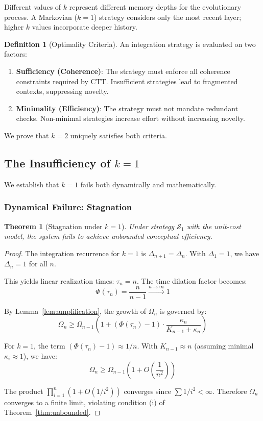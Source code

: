 \documentclass[11pt]{article}
\theoremstyle{definition}
\newtheorem{definition}{Definition}
\theoremstyle{plain}
\newtheorem{theorem}{Theorem}
\theoremstyle{remark}
\begin{document}
Different values of $k$ represent different memory depths for the evolutionary process. A Markovian ($k=1$) strategy considers only the most recent layer; higher $k$ values incorporate deeper history.

\begin{definition}[Optimality Criteria]
An integration strategy is evaluated on two factors:
\begin{enumerate}
\item \textbf{Sufficiency (Coherence)}: The strategy must enforce all coherence constraints required by CTT. Insufficient strategies lead to fragmented contexts, suppressing novelty.
\item \textbf{Minimality (Efficiency)}: The strategy must not mandate redundant checks. Non-minimal strategies increase effort without increasing novelty.
\end{enumerate}
\end{definition}

We prove that $k=2$ uniquely satisfies both criteria.

\subsection{The Insufficiency of $k=1$}

We establish that $k=1$ fails both dynamically and mathematically.

\subsubsection{Dynamical Failure: Stagnation}

\begin{theorem}[Stagnation under $k=1$]\label{thm:k1-stagnation}
Under strategy $\mathcal{S}_1$ with the unit-cost model, the system fails to achieve unbounded conceptual efficiency.
\end{theorem}

\begin{proof}
The integration recurrence for $k=1$ is $\Delta_{n+1} = \Delta_n$. With $\Delta_1 = 1$, we have $\Delta_n = 1$ for all $n$.

This yields linear realization times: $\tau_n = n$. The time dilation factor becomes:
\[
\Phi(\tau_n) = \frac{n}{n-1} \xrightarrow{n\to\infty} 1
\]

By Lemma~\ref{lem:amplification}, the growth of $\Omega_n$ is governed by:
\[
\Omega_n \geq \Omega_{n-1}\left(1 + (\Phi(\tau_n) - 1) \cdot \frac{\kappa_n}{K_{n-1} + \kappa_n}\right)
\]

For $k=1$, the term $(\Phi(\tau_n) - 1) \approx 1/n$. With $K_{n-1} \approx n$ (assuming minimal $\kappa_i \approx 1$), we have:
\[
\Omega_n \geq \Omega_{n-1}\left(1 + O\left(\frac{1}{n^2}\right)\right)
\]

The product $\prod_{i=1}^{n}(1 + O(1/i^2))$ converges since $\sum 1/i^2 < \infty$. Therefore $\Omega_n$ converges to a finite limit, violating condition (i) of Theorem~\ref{thm:unbounded}.
\end{proof}
\end{document}
